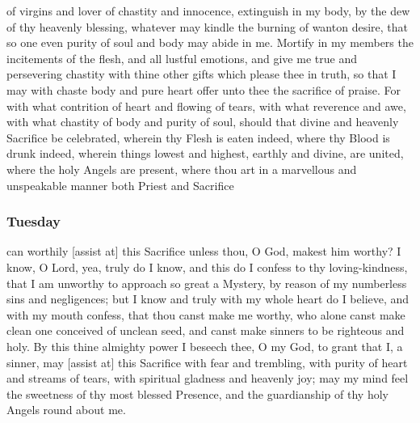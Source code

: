 \vspace{-0.1\baselineskip}

 of virgins and lover of chastity and innocence, extinguish in my body, by the dew of thy heavenly blessing, whatever may kindle the burning of wanton desire, that so one even purity of soul and body may abide in me. Mortify in my members the incitements of the flesh, and all lustful emotions, and give me true and persevering chastity with thine other gifts which please thee in truth, so that I may with chaste body and pure heart offer unto thee the sacrifice of praise. For with what contrition of heart and flowing of tears, with what reverence and awe, with what chastity of body and purity of soul, should that divine and heavenly Sacrifice be celebrated, wherein thy Flesh is eaten indeed, where thy Blood is drunk indeed, wherein things lowest and highest, earthly and divine, are united, where the holy Angels are present, where thou art in a marvellous and unspeakable manner both Priest and Sacrifice 

\vspace{-0.25\baselineskip}

\subsubsection{Tuesday}

\vspace{-0.1\baselineskip}

 can worthily [assist at] this Sacrifice unless thou, O God, makest him worthy? I know, O Lord, yea, truly do I know, and this do I confess to thy loving-kindness, that I am unworthy to approach so great a Mystery, by reason of my numberless sins and negligences; but I know and truly with my whole heart do I believe, and with my mouth confess, that thou canst make me worthy, who alone canst make clean one conceived of unclean seed, and canst make sinners to be righteous and holy. By this thine almighty power I beseech thee, O my God, to grant that I, a sinner, may [assist at] this Sacrifice with fear and trembling, with purity of heart and streams of tears, with spiritual gladness and heavenly joy; may my mind feel the sweetness of thy most blessed Presence, and the guardianship of thy holy Angels round about me.

